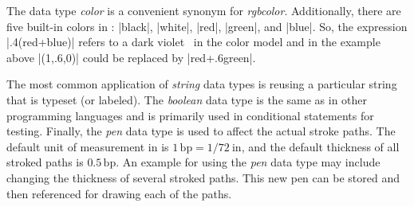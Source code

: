 The data type \textit{color} is a convenient synonym for
\textit{rgbcolor}.  Additionally, there are five built-in \RGB{} colors
in \MP{}: |black|, |white|, |red|, |green|, and |blue|.  So, the
expression |.4(red+blue)| refers to a dark violet~
in the \RGB{} color model and in the example above |(1,.6,0)| could be
replaced by |red+.6green|.

The most common application of \textit{string} data types is reusing a
particular string that is typeset (or labeled).  The \textit{boolean}
data type is the same as in other programming languages and is primarily
used in conditional statements for testing.  Finally, the \textit{pen}
data type is used to affect the actual stroke paths.  The default unit
of measurement in \MP{} is $1\,\mathrm{bp}=1/72\mathrm{\ in}$, and the
default thickness of all stroked paths is $0.5\,\mathrm{bp}$.  An
example for using the \textit{pen} data type may include changing the
thickness of several stroked paths.  This new pen can be stored and then
referenced for drawing each of the paths.
